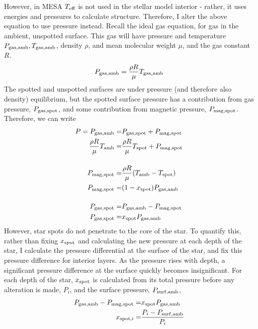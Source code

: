 However, in MESA $T_{\rm eff}$ is not used in the stellar model interior - rather, it uses energies and pressures to calculate structure. Therefore, I alter the above equation to use pressure instead.
Recall the ideal gas equation, for gas in the ambient, unspotted surface. This gas will have pressure and temperature $P_{\rm gas, amb}, T_{\rm gas, amb}$, density $\rho$, and mean molecular weight $\mu$, and the gas constant $R$.
\begin{equation}
    P_{\rm gas, amb} = \frac{\rho R}{\mu} T_{\rm gas, amb}
\end{equation}
The spotted and unspotted surfaces are under pressure (and therefore also density) equilibrium, but the spotted surface pressure has a contribution from gas pressure, $P_{\rm gas, spot}$, and some contribution from magnetic pressure, $P_{\rm mag, spot}$. Therefore, we can write
\begin{align}
    P = P_{\rm gas, amb} =& P_{\rm gas, spot} + P_{\rm mag, spot} \\
    \frac{\rho R}{\mu} T_{\rm amb} =& \frac{\rho R}{\mu} T_{\rm spot} + P_{\rm mag, spot} \\[12pt]
    P_{\rm mag, spot} =& \frac{\rho R}{\mu} (T_{\rm amb} - T_{\rm spot}) \\
    P_{\rm mag, spot} =& (1-x_{\rm spot}) P_{\rm gas, amb} \\[12pt]
    P_{\rm gas, spot} =& P_{\rm gas, amb} - P_{\rm mag, spot}\\
    P_{\rm gas, spot} =& x_{\rm spot} P_{\rm gas, amb}
\end{align}
However, star spots do not penetrate to the core of the star. To quantify this, rather than fixing $x_{\rm spot}$ and calculating the new pressure at each depth of the star, I calculate the pressure differential at the surface of the star, and fix this pressure difference for interior layers. As the pressure rises with depth, a significant pressure difference at the surface quickly becomes insignificant. For each depth of the star, $x_{\rm spot}$ is calculated from its total pressure before any alteration is made, $P_i$, and the surface pressure, $P_{\rm surf, amb}$,
\begin{align}
    P_{\rm gas, amb} - P_{\rm mag, spot} =& x_{\rm spot} P_{\rm gas, amb} \\
    x_{\rm spot, i} =& \frac{P_i - P_{\rm surf, amb}}{P_i}
\end{align}
